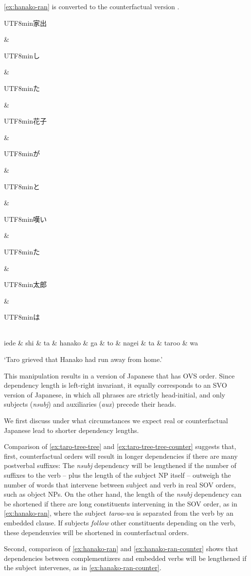 \documentclass[11pt,a4paper]{article}
\newcommand{\japanese}[1]{\begin{CJK}{UTF8}{min}#1\end{CJK}}
\begin{document}
\ref{ex:hanako-ran} is converted to the counterfactual version
\ex.
\begin{dependency}[theme = simple]
   \begin{deptext}[column sep=1em]
 \japanese{家出} \& \japanese{し} \& \japanese{た} \& \japanese{花子} \& \japanese{が} \& \japanese{と} \& \japanese{嘆い} \& \japanese{た} \& \japanese{太郎} \& \japanese{は}\\
           iede \& shi \& ta \& hanako \& ga \& to \& nagei \& ta \& taroo \& wa\\ 
   \end{deptext}
\end{dependency}
`Taro grieved that Hanako had run away from home.' \citep[p. 224]{iwasaki2013japanese}\label{ex:hanako-ran-counter}


This manipulation results in a version of Japanese that has OVS order.
Since dependency length is left-right invariant, it equally corresponds to an SVO version of Japanese, in which all phrases are strictly head-initial, and only subjects (\textit{nsubj}) and auxiliaries (\textit{aux}) precede their heads.


We first discuss under what circumstances we expect real or counterfactual Japanese lead to shorter dependency lengths.

Comparison of \ref{ex:taro-tree-tree} and \ref{ex:taro-tree-tree-counter} suggests that, first, counterfactual orders will result in longer dependencies if there are many postverbal suffixes: The \textit{nsubj} dependency will be lengthened if the number of suffixes to the verb -- plus the length of the subject NP itself -- outweigh the number of words that intervene between subject and verb in real SOV orders, such as object NPs.
On the other hand, the length of the \textit{nsubj} dependency can be shortened if there are long constituents intervening in the SOV order, as in \ref{ex:hanako-ran}, where the subject \textit{taroo-wa} is separated from the verb by an embedded clause.
If subjects \emph{follow} other constituents depending on the verb, these dependenvies will be shortened in counterfactual orders.

Second, comparison of \ref{ex:hanako-ran} and \ref{ex:hanako-ran-counter} shows that dependencies between complementizers and embedded verbs will be lengthened if the subject intervenes, as in \ref{ex:hanako-ran-counter}.
\end{document}

